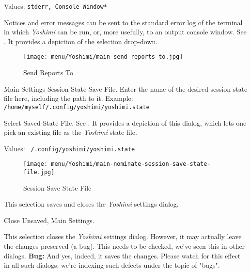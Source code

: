 
   Values: \texttt{stderr, Console Window*}

   Notices and error messages can be sent to the standard error log of
   the terminal in which 
   \textsl{Yoshimi} can be run, or, more usefully, to
   an output console window.
   See .
   It provides a depiction of the selection drop-down.

\begin{figure}[H]
   \centering 
   \texttt{[image: menu/Yoshimi/main-send-reports-to.jpg]}
   \caption[Send Reports]{Send Reports To}
   \label{fig:send_reports_to}
\end{figure}

   Main Settings Session State Save File.
   Enter the name of the desired session state file here, including
   the path to it.
   Example: \texttt{/home/myself/.config/yoshimi/yoshimi.state}

   Select Saved-State File.
   See .
   It provides a depiction of this dialog, which lets one pick an existing
   file as the \textsl{Yoshimi} state file.

   Values: \texttt{~/.config/yoshimi/yoshimi.state}

\begin{figure}[H]
   \centering 
   \texttt{[image: menu/Yoshimi/main-nominate-session-save-state-file.jpg]}
   \caption[Session Save State]{Session Save State File}
   \label{fig:session_save_state} 
\end{figure}

   This selection saves and closes the \textsl{Yoshimi} settings dialog.

   Close Unsaved, Main Settings.

   This selection closes the \textsl{Yoshimi} settings dialog.
   However, it may actually leave the changes preserved (a bug).
   This needs to be checked, we've seen this in other dialogs.
   \textbf{Bug:}
   And yes, indeed, it saves the changes.
   Please watch for this effect in all such dialogs; we're indexing such
   defects under the topic of "bugs".

